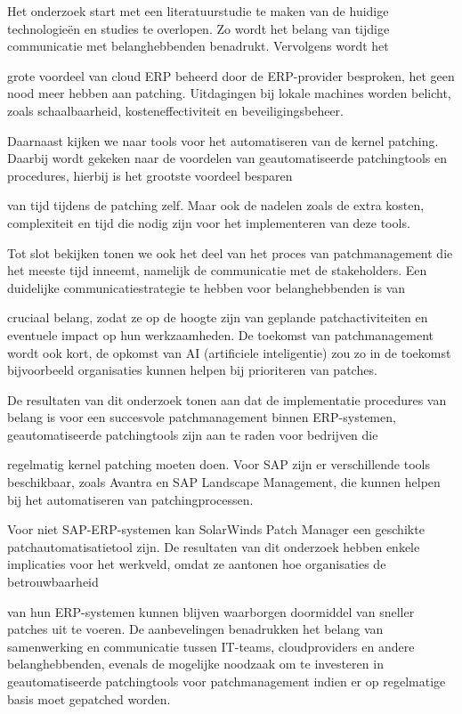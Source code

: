 Het onderzoek start met een literatuurstudie te maken van de huidige technologieën en studies te overlopen. Zo wordt het belang van tijdige communicatie met belanghebbenden benadrukt. Vervolgens wordt het 

grote voordeel van cloud ERP beheerd door de ERP-provider besproken, het geen nood meer hebben aan patching. Uitdagingen bij lokale machines worden belicht, zoals schaalbaarheid, kosteneffectiviteit en beveiligingsbeheer.

Daarnaast kijken we naar tools voor het automatiseren van de kernel patching. Daarbij wordt gekeken naar de voordelen van geautomatiseerde patchingtools en procedures, hierbij is het grootste voordeel besparen 

van tijd tijdens de patching zelf. Maar ook de nadelen zoals de extra kosten, complexiteit en tijd die nodig zijn voor het implementeren van deze tools.

Tot slot bekijken tonen we ook het deel van het proces van patchmanagement die het meeste tijd inneemt, namelijk de communicatie met de stakeholders. Een duidelijke communicatiestrategie te hebben voor belanghebbenden is van 

cruciaal belang, zodat ze op de hoogte zijn van geplande patchactiviteiten en eventuele impact op hun werkzaamheden. De toekomst van patchmanagement wordt ook kort, de opkomst van AI (artificiele inteligentie) zou zo in de toekomst bijvoorbeeld organisaties kunnen helpen bij prioriteren van patches.

De resultaten van dit onderzoek tonen aan dat de implementatie procedures van belang is voor een succesvole patchmanagement binnen ERP-systemen, geautomatiseerde patchingtools zijn aan te raden voor bedrijven die 

regelmatig kernel patching moeten doen. Voor SAP zijn er verschillende tools beschikbaar, zoals Avantra en SAP Landscape Management, die kunnen helpen bij het automatiseren van patchingprocessen. 

Voor niet SAP-ERP-systemen kan SolarWinds Patch Manager een geschikte patchautomatisatietool zijn. De resultaten van dit onderzoek hebben enkele implicaties voor het werkveld, omdat ze aantonen hoe organisaties de betrouwbaarheid 

van hun ERP-systemen kunnen blijven waarborgen doormiddel van sneller patches uit te voeren. De aanbevelingen benadrukken het belang van samenwerking en communicatie tussen IT-teams, cloudproviders en andere belanghebbenden, evenals de mogelijke noodzaak om te investeren in geautomatiseerde patchingtools voor patchmanagement indien er op regelmatige basis moet gepatched worden.